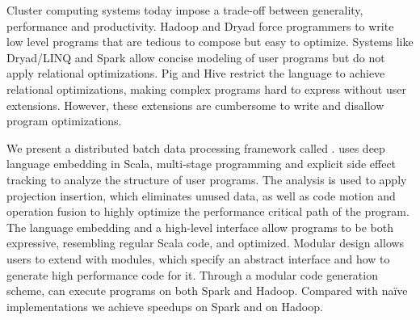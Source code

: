 Cluster computing systems today impose a trade-off between generality,
performance and productivity. Hadoop and Dryad force programmers to write low
level programs that are tedious to compose but easy to optimize. Systems like
Dryad/LINQ and Spark allow concise modeling of user programs but do not apply
relational optimizations. Pig and Hive restrict the language to achieve
relational optimizations, making complex programs hard to express without user
extensions. However, these extensions are cumbersome to write and disallow
program optimizations.

We present a distributed batch data processing framework called \tool.
\tool uses deep language embedding in Scala, multi-stage programming and explicit side effect
tracking to analyze the structure of user programs. The analysis is used to
apply projection insertion, which eliminates unused data, as well as code
motion and operation fusion to highly optimize the performance critical path of
the program. The language embedding and a high-level interface allow \tool
programs to be both expressive, resembling regular Scala code, and optimized.
Modular design allows users to extend \tool with modules, which specify an
abstract interface and how to generate high performance code for it. Through a
modular code generation scheme, \tool can execute programs on both Spark and
Hadoop. Compared with naïve implementations we achieve  speedups on
Spark and  on Hadoop.

